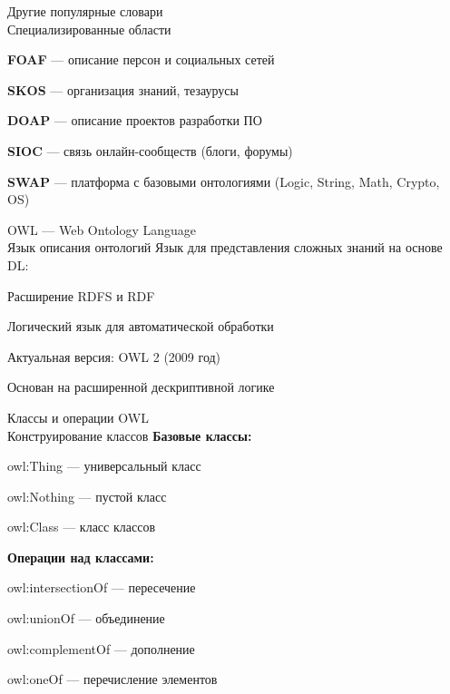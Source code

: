 \begin{frame}{Другие популярные словари\\Специализированные области}
	\topline
	\justifying
	\begin{textitemize}
		\item \textbf{FOAF} --- описание персон и социальных сетей
		\item \textbf{SKOS} --- организация знаний, тезаурусы
		\item \textbf{DOAP} --- описание проектов разработки ПО
		\item \textbf{SIOC} --- связь онлайн-сообществ (блоги, форумы)
		\item \textbf{SWAP} --- платформа с базовыми онтологиями (Logic, String, Math, Crypto, OS)
	\end{textitemize}
\end{frame}

\begin{frame}{OWL --- Web Ontology Language\\Язык описания онтологий}
	\topline
	\justifying
	Язык для представления сложных знаний на основе DL:
	\begin{textitemize}
		\item Расширение RDFS и RDF
		\item Логический язык для автоматической обработки
		\item Актуальная версия: OWL 2 (2009 год)
		\item Основан на расширенной дескриптивной логике
	\end{textitemize}
\end{frame}

\begin{frame}{Классы и операции OWL\\Конструирование классов}
	\topline
	\justifying
	\textbf{Базовые классы:}
	\begin{textitemize}
		\item owl:Thing --- универсальный класс
		\item owl:Nothing --- пустой класс
		\item owl:Class --- класс классов
	\end{textitemize}
	
	\textbf{Операции над классами:}
	\begin{textitemize}
		\item owl:intersectionOf --- пересечение
		\item owl:unionOf --- объединение
		\item owl:complementOf --- дополнение
		\item owl:oneOf --- перечисление элементов
	\end{textitemize}
\end{frame}

